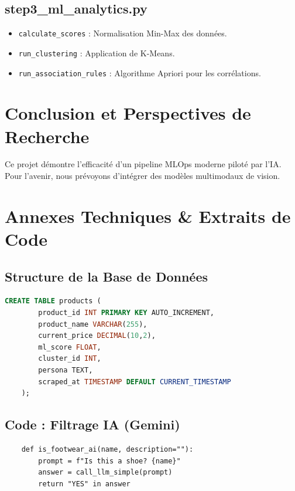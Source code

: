 \documentclass[11pt,a4paper,oneside]{report}
\begin{document}
    \section{step3\_ml\_analytics.py}
    \begin{itemize}
        \item \texttt{calculate_scores} : Normalisation Min-Max des données.
        \item \texttt{run_clustering} : Application de K-Means.
        \item \texttt{run_association_rules} : Algorithme Apriori pour les corrélations.
    \end{itemize}

    \chapter{Conclusion et Perspectives de Recherche}
    Ce projet démontre l'efficacité d'un pipeline MLOps moderne piloté par l'IA. Pour l'avenir, nous prévoyons d'intégrer des modèles multimodaux de vision.

    \newpage
    \appendix
    \chapter{Annexes Techniques & Extraits de Code}

    \section{Structure de la Base de Données}
    \begin{lstlisting}[language=SQL]
    CREATE TABLE products (
        product_id INT PRIMARY KEY AUTO_INCREMENT,
        product_name VARCHAR(255),
        current_price DECIMAL(10,2),
        ml_score FLOAT,
        cluster_id INT,
        persona TEXT,
        scraped_at TIMESTAMP DEFAULT CURRENT_TIMESTAMP
    );
    \end{lstlisting}

    \section{Code : Filtrage IA (Gemini)}
    \begin{lstlisting}
    def is_footwear_ai(name, description=""):
        prompt = f"Is this a shoe? {name}"
        answer = call_llm_simple(prompt)
        return "YES" in answer
    \end{lstlisting}
\end{document}

